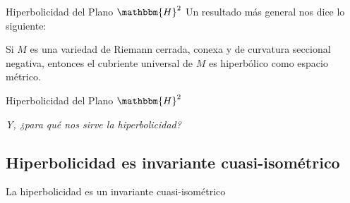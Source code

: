 \documentclass[xcolor=dvipsnames]{beamer}
\theoremstyle{largebreak}
\newcommand{\bbm}[1]{\ensuremath{\mathbbm{#1}}}
\begin{document}
\begin{frame}{Hiperbolicidad del Plano $\bbm{H}^2$}
    Un resultado más general nos dice lo siguiente:
    \pause
    \begin{theor}
        Si $M$ es una variedad de Riemann cerrada, conexa y de curvatura seccional negativa, entonces el cubriente universal de $M$ es hiperbólico como espacio métrico.
    \end{theor}

\end{frame}

\begin{frame}{Hiperbolicidad del Plano $\bbm{H}^2$}
    \begin{center}
        \Large\textit{Y, ¿para qué nos sirve la hiperbolicidad?}
    \end{center}
\end{frame}

\subsection{Hiperbolicidad es invariante cuasi-isométrico}

\begin{frame}
    \begin{center}
        \Large La hiperbolicidad es un invariante cuasi-isométrico
    \end{center}
\end{frame}
\end{document}
